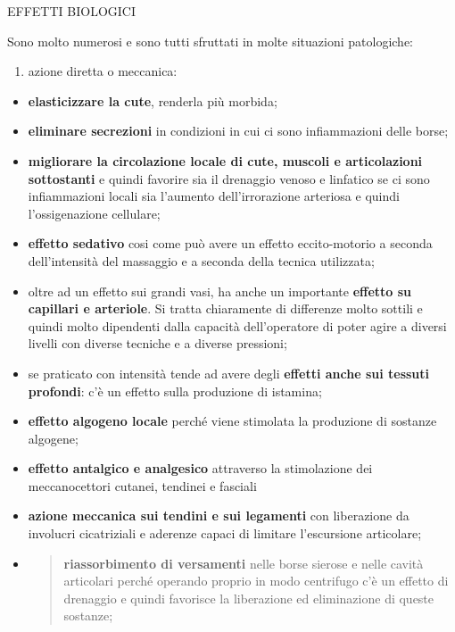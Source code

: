 \documentclass[]{article}
\begin{document}
EFFETTI BIOLOGICI

Sono molto numerosi e sono tutti sfruttati in molte situazioni
patologiche:

\begin{enumerate}
\def\labelenumi{\arabic{enumi}.}
\item
  azione diretta o meccanica:
\end{enumerate}

\begin{itemize}
\item
  \textbf{elasticizzare la cute}, renderla più morbida;
\item
  \textbf{eliminare secrezioni} in condizioni in cui ci sono
  infiammazioni delle borse;
\item
  \textbf{migliorare la circolazione locale di cute, muscoli e
  articolazioni sottostanti} e quindi favorire sia il drenaggio venoso e
  linfatico se ci sono infiammazioni locali sia l'aumento
  dell'irrorazione arteriosa e quindi l'ossigenazione cellulare;
\item
  \textbf{effetto sedativo} cosi come può avere un effetto
  eccito-motorio a seconda dell'intensità del massaggio e a seconda
  della tecnica utilizzata;
\item
  oltre ad un effetto sui grandi vasi, ha anche un importante
  \textbf{effetto su capillari e arteriole}. Si tratta chiaramente di
  differenze molto sottili e quindi molto dipendenti dalla capacità
  dell'operatore di poter agire a diversi livelli con diverse tecniche e
  a diverse pressioni;
\item
  se praticato con intensità tende ad avere degli \textbf{effetti anche
  sui tessuti profondi}: c'è un effetto sulla produzione di istamina;
\item
  \textbf{effetto algogeno locale} perché viene stimolata la produzione
  di sostanze algogene;
\item
  \textbf{effetto antalgico e analgesico} attraverso la stimolazione dei
  meccanocettori cutanei, tendinei e fasciali
\item
  \textbf{azione meccanica sui tendini e sui legamenti} con liberazione
  da involucri cicatriziali e aderenze capaci di limitare l'escursione
  articolare;
\item
  \begin{quote}
  \textbf{riassorbimento di versamenti} nelle borse sierose e nelle
  cavità articolari perché operando proprio in modo centrifugo c'è un
  effetto di drenaggio e quindi favorisce la liberazione ed eliminazione
  di queste sostanze;

\end{quote}
\end{itemize}
\end{document}
